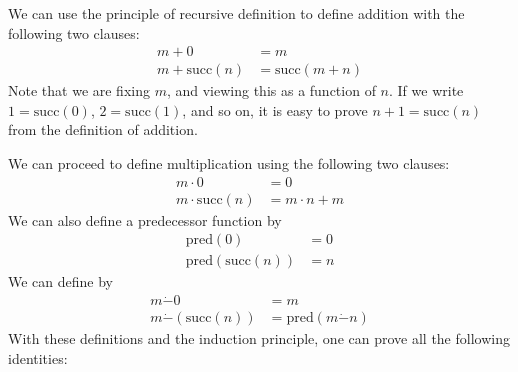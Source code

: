 \documentclass[letterpaper,10pt,english]{sphinxmanual}
\begin{document}
\sphinxAtStartPar
We can use the principle of recursive definition to define addition with the following two clauses:
\begin{equation*}
\begin{split}m + 0 & = m \\
m + \mathrm{succ}(n) & = \mathrm{succ}(m + n)\end{split}
\end{equation*}
\sphinxAtStartPar
Note that we are fixing \(m\), and viewing this as a function of \(n\). If we write \(1 = \mathrm{succ}(0)\), \(2 = \mathrm{succ}(1)\), and so on, it is easy to prove \(n + 1 = \mathrm{succ}(n)\) from the definition of addition.

\sphinxAtStartPar
We can proceed to define multiplication using the following two clauses:
\begin{equation*}
\begin{split}m \cdot 0 & = 0 \\
m \cdot \mathrm{succ}(n) & = m \cdot n + m\end{split}
\end{equation*}
\sphinxAtStartPar
We can also define a predecessor function by
\begin{equation*}
\begin{split}\mathrm{pred}(0) & = 0 \\
\mathrm{pred}(\mathrm{succ}(n)) & = n\end{split}
\end{equation*}
\sphinxAtStartPar
We can define  by
\begin{equation*}
\begin{split}m \dot - 0 & = m \\
m \dot - (\mathrm{succ}(n)) & = \mathrm{pred}(m \dot - n)\end{split}
\end{equation*}
\sphinxAtStartPar
With these definitions and the induction principle, one can prove all the following identities:
\end{document}
